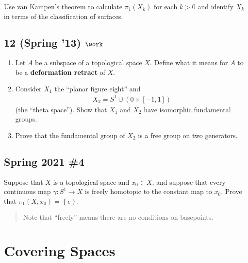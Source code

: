 Use van Kampen's theorem to calculate \(\pi_1 (X_k)\) for each \(k > 0\)
and identify \(X_k\) in terms of the classification of surfaces.

\hypertarget{spring-13-work-2}{%
\subsection{\texorpdfstring{12 (Spring '13)
\(\work\)}{12 (Spring '13) \textbackslash work}}\label{spring-13-work-2}}

\begin{enumerate}
\def\labelenumi{\alph{enumi}.}
\item
  Let \(A\) be a subspace of a topological space \(X\). Define what it
  means for \(A\) to be a \textbf{deformation retract} of \(X\).
\item
  Consider \(X_1\) the ``planar figure eight'' and
  \begin{align*}X_2 = S^1 \cup ({0} \times [-1, 1])\end{align*}
  (the ``theta space''). Show that \(X_1\) and \(X_2\) have isomorphic
  fundamental groups.
\item
  Prove that the fundamental group of \(X_2\) is a free group on two
  generators.
\end{enumerate}

\hypertarget{spring-2021-4}{%
\subsection{Spring 2021 \#4}\label{spring-2021-4}}

\begin{problem}[Spring 2021, 4]

Suppose that \(X\) is a topological space and \(x_0\in X\), and suppose
that every continuous map \(\gamma: S^1 \to X\) is freely homotopic to
the constant map to \(x_0\). Prove that
\(\pi_1(X, x_0) = \left\{{ e }\right\}\).

\begin{quote}
Note that ``freely'' means there are no conditions on basepoints.
\end{quote}

\end{problem}

\hypertarget{covering-spaces}{%
\section{Covering Spaces}\label{covering-spaces}}


